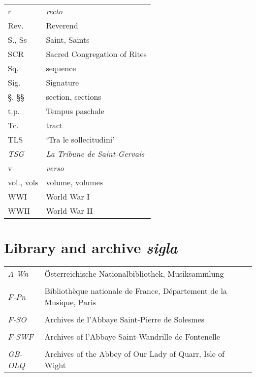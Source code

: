 \begin{longtable}[c]{@{}ll@{}}
r & \emph{recto} \\
Rev. & Reverend \\
S., Ss & Saint, Saints \\
SCR & Sacred Congregation of Rites \\
Sq. & sequence \\
Sig. & Signature \\
\S{}, \S{}\S{} & section, sections \\
t.p. & Tempus paschale \\
Tc. & tract \\
TLS & `Tra le sollecitudini' \\
\emph{TSG} & \emph{La Tribune de Saint-Gervais} \\
v & \emph{verso} \\
vol., vols & volume, volumes \\
WWI & World War I \\
WWII & World War II \\* \bottomrule
\end{longtable}

\newpage
\section*{Library and archive \emph{sigla}}
\begin{table}[h]
\centering
\begin{tabular}{@{}ll@{}}
\toprule
\emph{A-Wn} & Österreichische Nationalbibliothek, Musiksammlung \\ \\
\emph{F-Pn} & Bibliothèque nationale de France, Département de la Musique, Paris \\ \\
\emph{F-SO} & Archives de l'Abbaye Saint-Pierre de Solesmes \\ \\
\emph{F-SWF} & Archives of l'Abbaye Saint-Wandrille de Fontenelle \\ \\
\emph{GB-OLQ} & Archives of the Abbey of Our Lady of Quarr, Isle of Wight \\ \bottomrule
\end{tabular}
\end{table}
